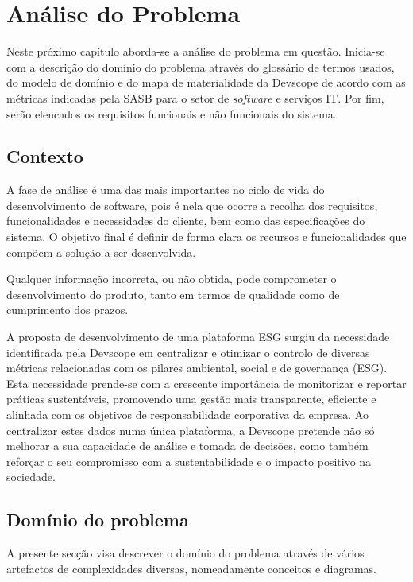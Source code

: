 
\chapter{Análise do Problema}
\label{chap:AP}

Neste próximo capítulo aborda-se a análise do problema em questão. Inicia-se com a descrição do domínio do problema através do glossário de termos usados, do modelo de domínio e do mapa de materialidade da Devscope de acordo com as métricas indicadas pela \gls{SASB} para o setor de \textit{software} e serviços IT. Por fim, serão elencados os requisitos funcionais e não funcionais do sistema.

\section{Contexto}
\label{sec:Context}

A fase de análise é uma das mais importantes no ciclo de vida do desenvolvimento de software, pois é nela que ocorre a recolha dos requisitos, funcionalidades e necessidades do cliente, bem como das especificações do sistema. O objetivo final é definir de forma clara os recursos e funcionalidades que compõem a solução a ser desenvolvida.

Qualquer informação incorreta, ou não obtida, pode comprometer o desenvolvimento do produto, tanto em termos de qualidade como de cumprimento dos prazos.

A proposta de desenvolvimento de uma plataforma ESG surgiu da necessidade identificada pela Devscope em centralizar e otimizar o controlo de diversas métricas relacionadas com os pilares ambiental, social e de governança (ESG). Esta necessidade prende-se com a crescente importância de monitorizar e reportar práticas sustentáveis, promovendo uma gestão mais transparente, eficiente e alinhada com os objetivos de responsabilidade corporativa da empresa. Ao centralizar estes dados numa única plataforma, a Devscope pretende não só melhorar a sua capacidade de análise e tomada de decisões, como também reforçar o seu compromisso com a sustentabilidade e o impacto positivo na sociedade.

\section{Domínio do problema}
\label{sec:DP} 

A presente secção visa descrever o domínio do problema através de vários artefactos de complexidades diversas, nomeadamente conceitos e diagramas.


